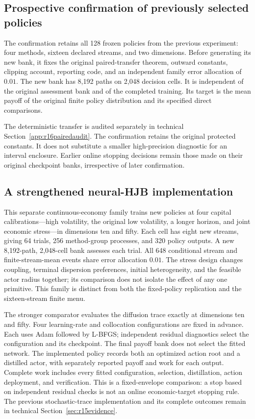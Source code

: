 \subsection{Prospective confirmation of previously selected policies}
\label{sec:r16replicationdesign}
The confirmation retains all 128 frozen policies from the previous experiment: four methods, sixteen declared streams, and two dimensions. Before generating its new bank, it fixes the original paired-transfer theorem, outward constants, clipping account, reporting code, and an independent family error allocation of $0.01$. The new bank has 8,192 paths on 2,048 decision cells. It is independent of the original assessment bank and of the completed training. Its target is the mean payoff of the original finite policy distribution and its specified direct comparisons.

The deterministic transfer is audited separately in technical Section~\ref{app:r16pairedaudit}. The confirmation retains the original protected constants. It does not substitute a smaller high-precision diagnostic for an interval enclosure. Earlier online stopping decisions remain those made on their original checkpoint banks, irrespective of later confirmation.

\subsection{A strengthened neural-HJB implementation}
\label{sec:r16hjbdesign}
This separate continuous-economy family trains new policies at four capital
calibrations---high volatility, the original low volatility, a longer horizon,
and joint economic stress---in dimensions ten and fifty. Each cell has eight
new streams, giving 64 trials, 256 method-group processes, and 320 policy
outputs. A new 8,192-path, 2,048-cell bank assesses each trial. All 648
conditional stream and finite-stream-mean events share error allocation
$0.01$. The stress design changes coupling, terminal dispersion preferences,
initial heterogeneity, and the feasible actor radius together; its comparison
does not isolate the effect of any one primitive. This family is distinct
from both the fixed-policy replication and the sixteen-stream finite menu.

The stronger comparator evaluates the diffusion trace exactly at dimensions ten and fifty. Four learning-rate and collocation configurations are fixed in advance. Each uses Adam followed by L-BFGS; independent residual diagnostics select the configuration and its checkpoint. The final payoff bank does not select the fitted network. The implemented policy records both an optimized action root and a distilled actor, with separately reported payoff and work for each output. Complete work includes every fitted configuration, selection, distillation, action deployment, and verification. This is a fixed-envelope comparison: a stop based on independent residual checks is not an online economic-target stopping rule. The previous stochastic-trace implementation and its complete outcomes remain in technical Section~\ref{sec:r15evidence}.

